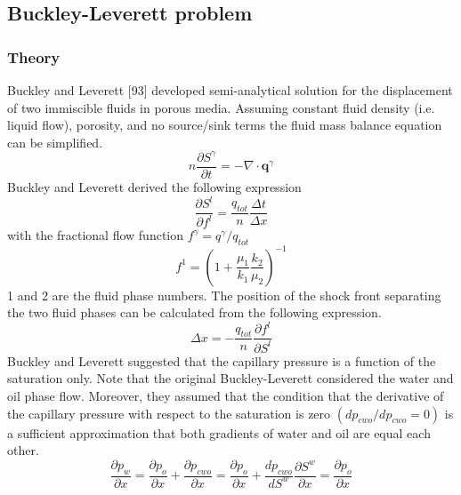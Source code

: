 \subsection{\upshape\textbf{Buckley-Leverett problem}}
\subsubsection*{\upshape\textbf{Theory}}
\hspace*{0.25cm}Buckley and Leverett [93] developed semi-analytical solution for
the displacement of two immiscible fluids in porous media.
Assuming constant fluid density (i.e. liquid flow), porosity, and
no source/sink terms the fluid mass balance equation can be
simplified.
\begin{equation}
n \frac{\partial S^\gamma }{\partial t} = - \nabla \cdot
\mathbf{q}^\gamma
\end{equation}
Buckley and Leverett derived the following expression
\begin{equation}
\frac{\partial S^l}{\partial f^l} = \frac{q_{tot}}{n} \frac{\Delta
t}{\Delta x}
\end{equation}
with the fractional flow function $f^\gamma = q^\gamma/q_{tot}$
\begin{equation}
f^1 = \left( 1 + \frac{\mu_1}{k_1} \frac{k_2}{\mu_2} \right)^{-1}
\end{equation}
1 and 2 are the fluid phase numbers. The position of the shock front separating the two fluid phases
can be calculated from the following expression.
\begin{equation}
\Delta x = - \frac{q_{tot}}{n} \frac{\partial f^l}{\partial S^l}
\end{equation}
\hspace*{0.25cm}Buckley and Leverett suggested that the capillary pressure is a
function of the saturation only. Note that the original
Buckley-Leverett considered the water and oil phase flow.
Moreover, they assumed that the condition that the derivative of
the capillary pressure with respect to the saturation is zero
$(dp_{cwo}/dp_{cwo}= 0)$ is a sufficient approximation that both
gradients of water and oil are equal each other.
\begin{equation}
\frac{\partial p_w }{\partial x} = \frac{\partial p_o}{\partial x}
+ \frac{\partial p_{cwo}}{\partial x} = \frac{\partial p_o
}{\partial x} + \frac{dp_{cwo}}{dS^w }\frac{\partial S^w}{\partial
x} = \frac{\partial p_o}{\partial x}
\end{equation}
